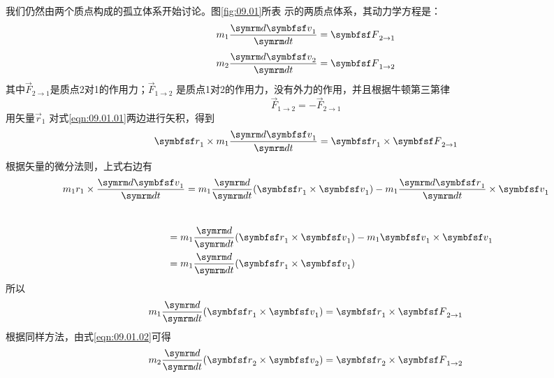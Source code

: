 我们仍然由两个质点构成的孤立体系开始讨论。图\ref{fig:09.01}所表
示的两质点体系，其动力学方程是：
\begin{equation}\label{eqn:09.01.01}
  m _ { 1 } \frac { \dif \vec{v} _ { 1 } } { \dif t } = \vec{F} _ { 2 \to 1 }
\end{equation}
\begin{equation}\label{eqn:09.01.02}
  m _ { 2 } \frac { \dif \vec{v} _ { 2 } } { \dif t } = \vec{F} _ { 1 \to 2 }
\end{equation}
其中$\vec{F} _ { 2 \to 1 }$是质点2对1的作用力；$\vec{F} _ { 1 \to 2 }$
是质点1对2的作用力，没有外力的作用，并且根据牛顿第三第律
\begin{equation}\label{eqn:09.01.03}
  \vec{F} _ { 1 \to 2 } = - \vec{F} _ { 2 \to 1 }
\end{equation}
用矢量$\vec{r} _ { 1 }$ 对式\eqref{eqn:09.01.01}两边进行矢积，得到
\begin{equation*}
  \vec{r} _ { 1 } \times m _ { 1 } \frac { \dif \vec{v} _ { 1 } } { \dif t } = \vec{r} _ { 1 } \times \vec{F} _ { 2 \to 1 }
\end{equation*}
根据矢量的微分法则，上式右边有
\begin{equation*}
  m _ 1 r _ { 1 } \times \frac { \dif \vec{v}_ { 1 } } { \dif t } = m _ { 1 } \frac { \dif } { \dif t } ( \vec{r} _ { 1 } \times \vec{v} _ { 1 }) - m _ { 1 } \frac { \dif \vec{r} _ { 1 } } { \dif t} \times \vec{v} _ { 1 }
\end{equation*}
\clearpage\mbox{}~\vspace{-2em}
\begin{equation*}
  \begin{aligned}
     \hspace{5em}& = m _ { 1 } \frac { \dif } { \dif t } ( \vec{r} _ { 1 } \times \vec{v} _ { 1 } ) - m _ { 1 } \vec{v} _ { 1 } \times \vec{v} _ { 1 } \\
     & = m _ { 1 } \frac { \dif } { \dif t } ( \vec{r} _ { 1 } \times \vec{v} _ { 1 } )
  \end{aligned}
\end{equation*}
所以
\begin{equation}\label{eqn:09.01.04}
  m _{ 1 } \frac { \dif }{\dif t } ( \vec{r} _ { 1 } \times \vec{v} _ { 1 } ) = \vec{r} _ { 1 } \times \vec{F} _ { 2 \to 1 }
\end{equation}
根据同样方法，由式\eqref{eqn:09.01.02}可得
\begin{equation}\label{eqn:09.01.05}
  m _{ 2 } \frac { \dif }{\dif t } ( \vec{r} _ { 2 } \times \vec{v} _ { 2 } ) = \vec{r} _ { 2 } \times \vec{F} _ { 1 \to 2 }
\end{equation}
